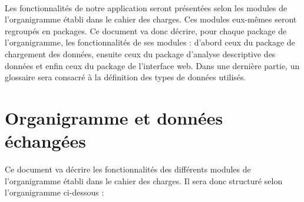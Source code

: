 		\paragraph{}Les fonctionnalités de notre application seront présentées selon les modules de l'organigramme établi dans le cahier des charges. Ces modules eux-mêmes seront regroupés en packages. Ce document va donc décrire, pour chaque package de l'organigramme, les fonctionnalités de ses modules : d'abord ceux du package de chargement des données, ensuite ceux du package d'analyse descriptive des données et enfin ceux du package de l'interface web. Dans une dernière partie, un glossaire sera consacré à la définition des types de données utilisés.
		
	\section{Organigramme et données échangées}
		Ce document va décrire les fonctionnalités des différents modules de l'organigramme établi dans le cahier des charges. Il sera donc structuré selon l'organigramme ci-dessous :
		\newpage
